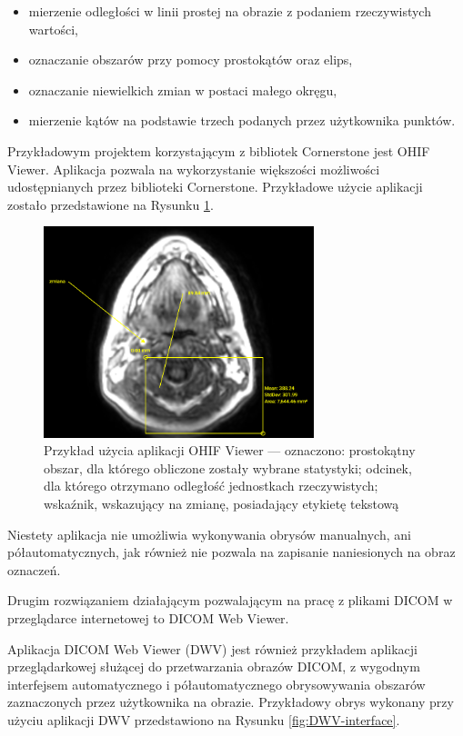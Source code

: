 \documentclass[a4paper,11pt,twoside,openright]{report}
\theoremstyle{definition}
\begin{document}
\begin{itemize}[noitemsep]
\item mierzenie odległości w linii prostej na obrazie z podaniem rzeczywistych wartości,
\item oznaczanie obszarów przy pomocy prostokątów oraz elips,
\item oznaczanie niewielkich zmian w postaci małego okręgu,
\item mierzenie kątów na podstawie trzech podanych przez użytkownika punktów.
\end{itemize}

Przykładowym projektem korzystającym z bibliotek Cornerstone jest OHIF Viewer.
Aplikacja pozwala na wykorzystanie większości możliwości udostępnianych przez
biblioteki Cornerstone. Przykładowe użycie aplikacji zostało przedstawione na
Rysunku \ref{fig:OHIF-example}.

\begin{figure}[tbh!]
	\center
	\includegraphics[width=0.7\textwidth]{OHIF-example}
	\caption{Przykład użycia aplikacji OHIF Viewer --- oznaczono: prostokątny obszar,
	dla którego obliczone zostały wybrane statystyki; odcinek, dla którego otrzymano
	odległość jednostkach rzeczywistych; wskaźnik, wskazujący na zmianę, posiadający
	etykietę tekstową}
    	\label{fig:OHIF-example}
\end{figure}

Niestety aplikacja nie umożliwia wykonywania obrysów manualnych, ani półautomatycznych,
jak również nie pozwala na zapisanie naniesionych na obraz oznaczeń.

Drugim rozwiązaniem działającym pozwalającym na pracę z plikami DICOM w przeglądarce
internetowej to DICOM Web Viewer.

Aplikacja DICOM Web Viewer (DWV) \cite{DWV} jest również przykładem aplikacji
przeglądarkowej służącej do przetwarzania obrazów DICOM, z wygodnym interfejsem
automatycznego i półautomatycznego obrysowywania obszarów zaznaczonych
przez użytkownika na obrazie. Przykładowy obrys wykonany przy użyciu aplikacji
DWV przedstawiono na Rysunku \ref{fig:DWV-interface}.
\end{document}
